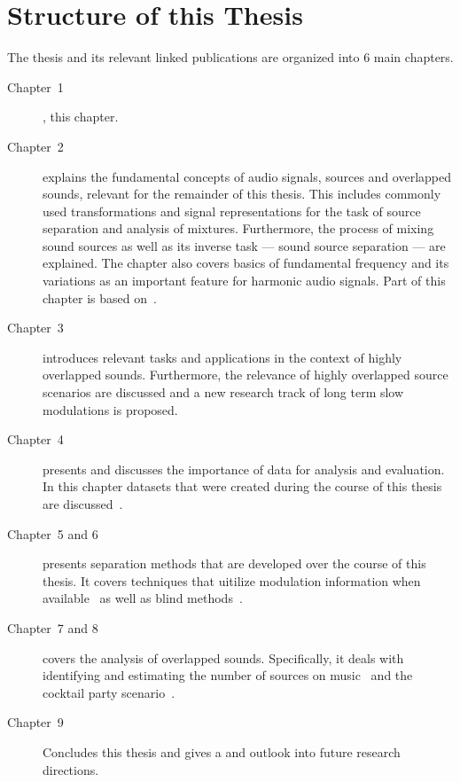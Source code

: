\section{Structure of this Thesis}

The thesis and its relevant linked publications are organized into 6 main chapters.
\begin{description}
  \item[Chapter~1], this chapter.
  \item[Chapter~2] explains the fundamental concepts of audio signals, sources and overlapped sounds, relevant for the remainder of this thesis. This includes commonly used transformations and signal representations for the task of source separation and analysis of mixtures.
  Furthermore, the process of mixing sound sources as well as its inverse task --- sound source separation --- are explained.
  The chapter also covers basics of fundamental frequency and its variations as an important feature for harmonic audio signals.
  Part of this chapter is based on~\cite{rafii18}.
  \item[Chapter~3] introduces relevant tasks and applications in the context of highly overlapped sounds.
  Furthermore, the relevance of highly overlapped source scenarios are discussed and a new research track of long term slow modulations is proposed.
  \item[Chapter~4] presents and discusses the importance of data for analysis and evaluation.
  In this chapter datasets that were created during the course of this thesis are discussed~\cite{oss_wice, oss_unison, oss_libricount, liutkus17}.
  \item[Chapter~5 and 6] presents separation methods that are developed over the course of this thesis. It covers techniques that uitilize modulation information when available~\cite{stoeter14, stoeter15acm, stoeter15icassp} as well as blind methods~\cite{stoeter16, liutkus17}.
  \item[Chapter~7 and 8] covers the analysis of overlapped sounds. Specifically, it deals with identifying and estimating the number of sources on music~\cite{schoeffler13, stoeter13} and the cocktail party scenario~\cite{stoeter19, stoeter18}.
  \item[Chapter~9] Concludes this thesis and gives a and outlook into future research directions.
\end{description}
